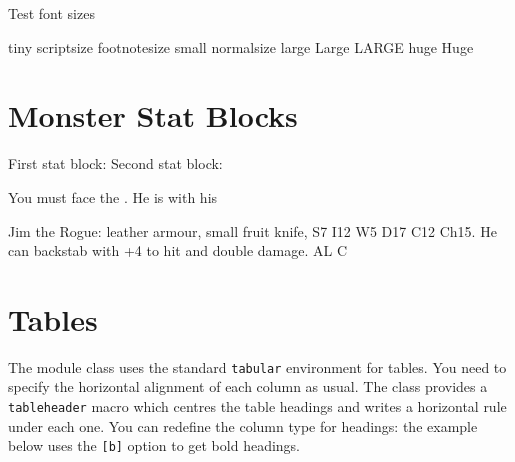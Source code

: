 \documentclass[a4paper,serif]{module}       %
\begin{document}
%
%
%
%

Test font sizes

{\tiny tiny}
{\scriptsize scriptsize}
{\footnotesize footnotesize}
{\small small}
{\normalsize normalsize}
{\large large}
{\Large Large}
{\LARGE LARGE}
{\huge huge}
{\Huge Huge}

\section{Monster Stat Blocks}


First stat block:
Second stat block:

You must face the . 
He is with his 




\begin{statblockfreestyle}
Jim the Rogue: leather armour, small fruit knife, S7 I12 W5 D17 C12 Ch15. He can backstab with +4 to hit and double damage. AL C
\end{statblockfreestyle}

\section{Tables}

The module class uses the standard \texttt{tabular} environment for tables. You need to specify the horizontal alignment of each column as 
usual. The class provides a \texttt{tableheader} macro which centres the table headings and writes a horizontal rule under each
one. You can redefine the column type for headings: the example below uses the \texttt{[b]} option to get bold headings.
\end{document}
